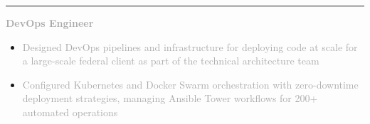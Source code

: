 \documentclass[10pt,letterpaper]{article}
\newcommand{\companyHeader}[2]{%
    \vspace{3pt}
    \noindent\textcolor{#2}{\rule{3pt}{10pt}}\hspace{6pt}{\headingfont\normalsize\textbf{\textcolor{darkgray}{#1}}}
    \vspace{1pt}
}
\newcommand{\positionHeader}[2]{%
    \noindent\textbf{\textcolor{darkgray}{#2}}\hspace{4pt}{\footnotesize\textcolor{mediumgray}{//}}\hspace{4pt}{\footnotesize\itshape\textcolor{mediumgray}{#1}}
    \vspace{1pt}
}
\begin{document}
\begin{minipage}[t][10.5in][t]{5.6in}
\begin{minipage}{5.0in}
\companyHeader{Accenture Federal Services}{company3}

\positionHeader{2018 – 2021}{DevOps Engineer}
\begin{itemize}
    \setlength\itemsep{0.25pt}
    \item\small\textcolor{darkgray}{Designed DevOps pipelines and infrastructure for deploying code at scale for a large-scale federal client as part of the technical architecture team}
    \item\small\textcolor{darkgray}{Configured Kubernetes and Docker Swarm orchestration with zero-downtime deployment strategies, managing Ansible Tower workflows for 200+ automated operations}
\end{itemize}

\end{minipage}
\end{minipage}
\end{document}
